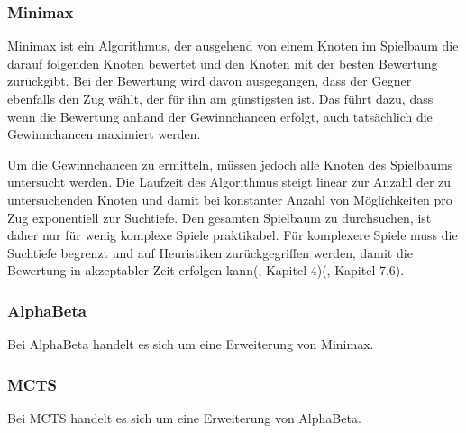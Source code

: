 
\subsubsection{Minimax}

Minimax ist ein Algorithmus, der ausgehend von einem Knoten im Spielbaum die darauf folgenden Knoten bewertet und den Knoten mit der besten Bewertung zurückgibt. Bei der Bewertung wird davon ausgegangen, dass der Gegner ebenfalls den Zug wählt, der für ihn am günstigsten ist. Das führt dazu, dass wenn die Bewertung anhand der Gewinnchancen erfolgt, auch tatsächlich die Gewinnchancen maximiert werden.

Um die Gewinnchancen zu ermitteln, müssen jedoch alle Knoten des Spielbaums untersucht werden. Die Laufzeit des Algorithmus steigt linear zur Anzahl der zu untersuchenden Knoten und damit bei konstanter Anzahl von Möglichkeiten pro Zug exponentiell zur Suchtiefe. Den gesamten Spielbaum zu durchsuchen, ist daher nur für wenig komplexe Spiele praktikabel. Für komplexere Spiele muss die Suchtiefe begrenzt und auf Heuristiken zurückgegriffen werden, damit die Bewertung in akzeptabler Zeit erfolgen kann(\cite{Ferguson.January2019}, Kapitel 4)(\cite{Heineman.October2008}, Kapitel 7.6).

\subsubsection{AlphaBeta}

Bei AlphaBeta handelt es sich um eine Erweiterung von Minimax.

\subsubsection{MCTS}

Bei MCTS handelt es sich um eine Erweiterung von AlphaBeta.